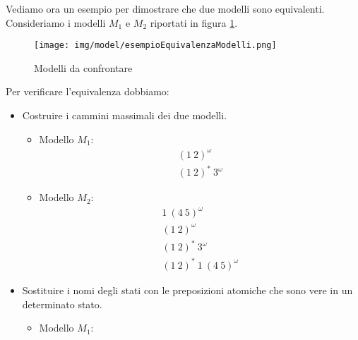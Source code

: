 \begin{esempio}
    Vediamo ora un esempio per dimostrare che due modelli sono equivalenti.
    Consideriamo i modelli $M_1$ e $M_2$ riportati in figura \ref{fig:esempioModelli}.
    \begin{figure}[!ht]
        \centering
        \texttt{[image: img/model/esempioEquivalenzaModelli.png]}
        \caption{Modelli da confrontare}
        \label{fig:esempioModelli}
    \end{figure}
    Per verificare l'equivalenza dobbiamo:
    \begin{itemize}
        \item Costruire i cammini massimali dei due modelli.
              \begin{itemize}
                  \item Modello $M_1$:
                        \begin{equation}
                            \begin{array}{l}
                                (1 \ 2)^\omega \\
                                (1 \ 2)^\ast \ 3^\omega
                            \end{array}
                        \end{equation}
                  \item Modello $M_2$:
                        \begin{equation}
                            \begin{array}{l}
                                1 \ (4 \ 5)^\omega      \\
                                (1 \ 2)^{\omega}        \\
                                (1 \ 2)^\ast \ 3^\omega \\
                                (1 \ 2)^\ast \ 1 \ (4 \ 5)^\omega
                            \end{array}
                        \end{equation}
              \end{itemize}
        \item Sostituire i nomi degli stati con le preposizioni atomiche che sono
              vere in un determinato stato.
              \begin{itemize}
                  \item Modello $M_1$:
                        \begin{equation}
                            \begin{array}{l}

\end{array}
\end{equation}
\end{itemize}
\end{itemize}
\end{esempio}
